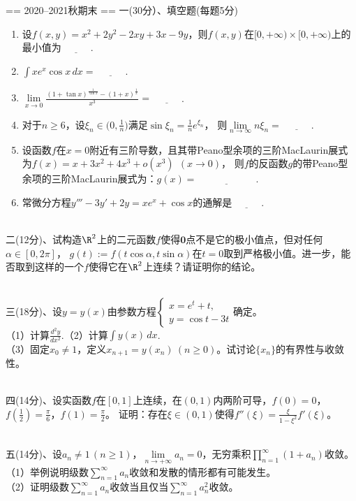 == 2020--2021秋期末 ==
一(30分）、填空题(每题5分)
\begin{enumerate}[label=(\arabic*)]
\item 设$f(x,y)=x^2+2y^2-2xy+3x-9y$，则$f(x,y)$在$[0,+\infty)\times[0,+\infty)$上的最小值为$\underline{\qquad\quad}$.
\item $\displaystyle \int xe^x\cos x\,dx=\underline{\qquad\quad}$.
\item $\displaystyle \lim\limits_{x\to0} \frac{(1+\tan x)^\frac{1}{\tan x}-(1+x)^\frac{1}{x}}{x^3}=\underline{\qquad\quad}$.\\
\item 对于$n\geq6$，设$\displaystyle \xi_n\in\Big(0,\frac{1}{n}\Big)$满足$\displaystyle \sin\xi_n=\frac{1}{n}e^{\xi_n}$，
则$\lim\limits_{n\to\infty}n\xi_n=\underline{\qquad\quad}$.
\item 设函数$f$在$x=0$附近有三阶导数，且其带Peano型余项的三阶MacLaurin展式为$f(x)=x+3x^2+4x^3+o(x^3)\ \ (x\to0)$，
则$f$的反函数$g$的带Peano型余项的三阶MacLaurin展式为：$g(x)=\underline{\qquad\qquad\qquad}$.
\item 常微分方程$y'''-3y'+2y=xe^x+\cos x$的通解是$\underline{\qquad\quad}$.
\end{enumerate}
~\\
二(12分)、试构造$\R^2$上的二元函数$f$使得$\mathbf{0}$点不是它的极小值点，但对任何$\alpha\in[0,2\pi]$，
$g(t):=f(t\cos\alpha,t\sin\alpha)$在$t=0$取到严格极小值。进一步，能否取到这样的一个$f$使得它在$\R^2$上连续？请证明你的结论。

~\\
三(18分)、设$y=y(x)$由参数方程$\begin{cases}x=e^t+t,\\y=\cos t-3t\end{cases}$确定。\\
（1）计算$\displaystyle\frac{d^2y}{dx^2}$.\qquad （2）计算$\displaystyle \int y(x)\,dx$.\\
（3）固定$x_0\ne1$，定义$x_{n+1}=y(x_n)\ (n\ge0)$。试讨论$\{x_n\}$的有界性与收敛性。

~\\
四(14分)、设实函数$f$在$[0,1]$上连续，在$(0,1)$内两阶可导，$f(0)=0$，$f(\frac{1}{2})=\frac{\pi}{6}$，$f(1)=\frac{\pi}{2}$。
证明：存在$\xi\in(0,1)$使得$\displaystyle f''(\xi)=\frac{\xi}{1-\xi^2}f'(\xi)$。

~\\
五(14分)、设$a_n\ne1\,(n\ge1)$，$\lim\limits_{n\to+\infty}a_n=0$，无穷乘积$\displaystyle \prod_{n=1}^\infty(1+a_n)$收敛。\\
（1）举例说明级数$\displaystyle\sum_{n=1}^\infty a_n$收敛和发散的情形都有可能发生。\\
（2）证明级数$\displaystyle\sum_{n=1}^\infty a_n$收敛当且仅当$\displaystyle\sum_{n=1}^\infty a_n^2$收敛。


